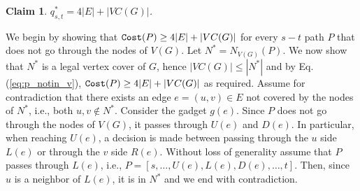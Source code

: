 \documentclass[12pt]{article}
\newtheorem{claim}{Claim}[section]
\def\Cost{\mbox{\tt Cost}}
\def\Proof{\par\noindent{\bf Proof:~}}
\def\Cost{\mbox{\tt Cost}}
\begin{document}
\begin{claim}
\label{cl:vc}
$q^{*}_{s,t}=4|E|+|VC(G)|$.
\end{claim}
\Proof
We begin by showing that $\Cost(P)\geq 4|E|+|VC(G)|$ for every $s-t$ path $P$ that does not go through the nodes of $V(G)$.
Let $N^{*}=N_{V(G)}(P)$. We now show that $N^{*}$ is a legal vertex cover of $G$, hence $|VC(G)| \leq |N^{*}|$ and by Eq. (\ref{eq:p_notin_v}), $\Cost(P)\geq 4|E|+|VC(G)|$ as required. Assume for contradiction that there exists an edge $e=(u,v) \in E$ not covered by the nodes of $N^{*}$, i.e., both $u,v \notin N^{*}$. Consider the gadget $g(e)$. Since $P$ does not go through the nodes of $V(G)$, it passes through $U(e)$ and $D(e)$. In particular, when reaching $U(e)$, a decision is made between passing through the $u$ side $L(e)$ or through the $v$ side $R(e)$. Without loss of generality assume that $P$ passes through $L(e)$, i.e., $P=[s, \ldots, U(e),L(e), D(e), \ldots, t]$. Then, since $u$ is a neighbor of $L(e)$, it is in $N^{*}$ and we end with contradiction.
\end{document}
